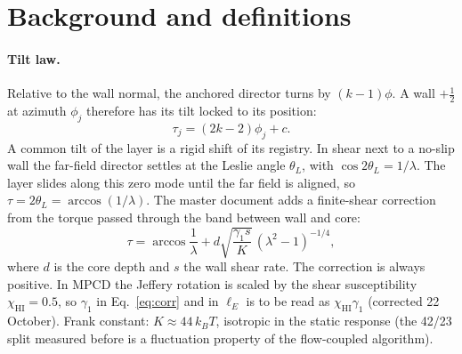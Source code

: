 \documentclass[11pt,a4paper]{article}
\newcommand{\half}{\tfrac12}
\newcommand{\kT}{k_BT}
\begin{document}
\section{Background and definitions}

\paragraph{Tilt law.} Relative to the wall normal, the anchored director turns by $(k-1)\phi$. A wall $+\half$ at azimuth $\phi_j$ therefore has its tilt locked to its position:
\begin{equation}
\tau_j=(2k-2)\phi_j+c .\label{eq:lock}
\end{equation}
A common tilt of the layer is a rigid shift of its registry. In shear next to a no-slip wall the far-field director settles at the Leslie angle $\theta_L$, with $\cos2\theta_L=1/\lambda$. The layer slides along this zero mode until the far field is aligned, so $\tau=2\theta_L=\arccos(1/\lambda)$. The master document adds a finite-shear correction from the torque passed through the band between wall and core:
\begin{equation}
\tau=\arccos\frac1\lambda+d\sqrt{\frac{\gamma_1 s}{K}}\,(\lambda^2-1)^{-1/4},\label{eq:corr}
\end{equation}
where $d$ is the core depth and $s$ the wall shear rate. The correction is always positive. In MPCD the Jeffery rotation is scaled by the shear
susceptibility $\chi_\mathrm{HI}=0.5$, so $\gamma_1$ in Eq.~\eqref{eq:corr} and in $\ell_E$ is to be read as $\chi_\mathrm{HI}\gamma_1$ (corrected 22 October). Frank constant:
$K\approx44\,\kT$, isotropic in the static response (the 42/23 split measured before is a fluctuation property of the flow-coupled algorithm).
\end{document}
